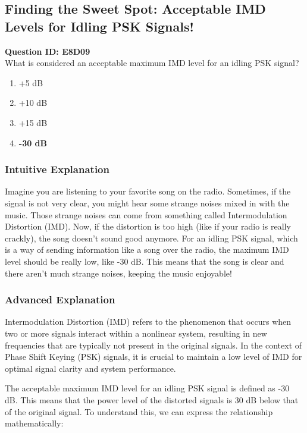 \subsection{Finding the Sweet Spot: Acceptable IMD Levels for Idling PSK Signals!}

\begin{tcolorbox}
\textbf{Question ID: E8D09} \\
What is considered an acceptable maximum IMD level for an idling PSK signal? 
\begin{enumerate}[label=(\Alph*)]
    \item +5 dB
    \item +10 dB
    \item +15 dB
    \item \textbf{-30 dB}
\end{enumerate}
\end{tcolorbox}

\subsubsection{Intuitive Explanation}
Imagine you are listening to your favorite song on the radio. Sometimes, if the signal is not very clear, you might hear some strange noises mixed in with the music. Those strange noises can come from something called Intermodulation Distortion (IMD). Now, if the distortion is too high (like if your radio is really crackly), the song doesn't sound good anymore. For an idling PSK signal, which is a way of sending information like a song over the radio, the maximum IMD level should be really low, like -30 dB. This means that the song is clear and there aren’t much strange noises, keeping the music enjoyable!

\subsubsection{Advanced Explanation}
Intermodulation Distortion (IMD) refers to the phenomenon that occurs when two or more signals interact within a nonlinear system, resulting in new frequencies that are typically not present in the original signals. In the context of Phase Shift Keying (PSK) signals, it is crucial to maintain a low level of IMD for optimal signal clarity and system performance.

The acceptable maximum IMD level for an idling PSK signal is defined as -30 dB. This means that the power level of the distorted signals is 30 dB below that of the original signal. To understand this, we can express the relationship mathematically:

